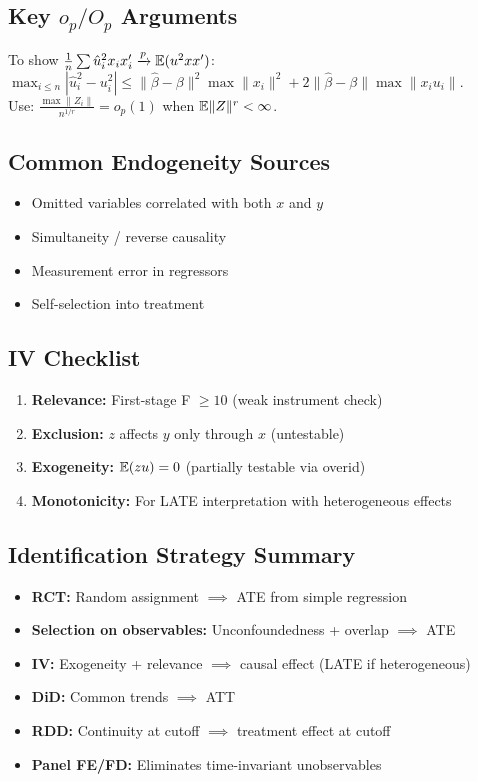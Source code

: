 \subsection{Key \texorpdfstring{$o_p/O_p$}{op/Op} Arguments}
To show $\frac{1}{n}\sum \hat{u}_i^2 x_ix_i' \xrightarrow{p} \mathbb{E}(u^2xx')$: \\
$\max_{i\leq n}|\hat{u}_i^2-u_i^2| \leq \|\hat\beta-\beta\|^2\max\|x_i\|^2 + 2\|\hat\beta-\beta\|\max\|x_iu_i\|$. \\
Use: $\frac{\max\|Z_i\|}{n^{1/r}}=o_p(1)$ when $\mathbb{E}\|Z\|^r<\infty$.

\subsection{Common Endogeneity Sources}
\begin{itemize}[nosep]
    \item Omitted variables correlated with both $x$ and $y$
    \item Simultaneity / reverse causality
    \item Measurement error in regressors
    \item Self-selection into treatment
\end{itemize}

\subsection{IV Checklist}
\begin{enumerate}[nosep]
    \item \textbf{Relevance:} First-stage F $\geq 10$ (weak instrument check)
    \item \textbf{Exclusion:} $z$ affects $y$ only through $x$ (untestable)
    \item \textbf{Exogeneity:} $\mathbb{E}(zu)=0$ (partially testable via overid)
    \item \textbf{Monotonicity:} For LATE interpretation with heterogeneous effects
\end{enumerate}

\subsection{Identification Strategy Summary}
\begin{itemize}[nosep]
    \item \textbf{RCT:} Random assignment $\implies$ ATE from simple regression
    \item \textbf{Selection on observables:} Unconfoundedness + overlap $\implies$ ATE
    \item \textbf{IV:} Exogeneity + relevance $\implies$ causal effect (LATE if heterogeneous)
    \item \textbf{DiD:} Common trends $\implies$ ATT
    \item \textbf{RDD:} Continuity at cutoff $\implies$ treatment effect at cutoff
    \item \textbf{Panel FE/FD:} Eliminates time-invariant unobservables
\end{itemize}

